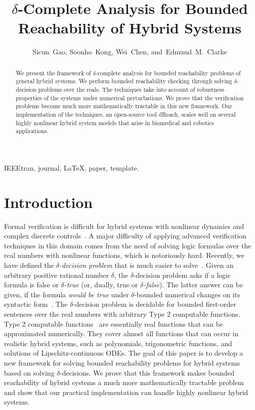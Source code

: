 \documentclass[journal]{IEEEtran}
\begin{document}
\title{$\delta$-Complete Analysis for Bounded Reachability of Hybrid Systems}
\author{Sicun~Gao,
  Soonho~Kong,
  Wei~Chen,
  and~Edmund~M.~Clarke}

\maketitle
\begin{abstract}
We present the framework of $\delta$-complete analysis for bounded reachability problems of general hybrid systems. We perform bounded reachability checking through solving $\delta$-decision problems over the reals. The techniques take into account of robustness properties of the systems under numerical perturbations. We prove that the verification problems become much more mathematically tractable in this new framework. Our implementation of the techniques, an open-source tool {\sf dReach}, scales well on several highly nonlinear hybrid system models that arise in biomedical and robotics applications.
\end{abstract}
\begin{IEEEkeywords}
IEEEtran, journal, \LaTeX, paper, template.
\end{IEEEkeywords}

\section{Introduction}
Formal verification is difficult for hybrid systems with nonlinear dynamics and complex discrete controls~\cite{DBLP:conf/emsoft/Alur11,DBLP:conf/lics/Henzinger96}. A major difficulty of applying advanced verification techniques in this domain comes from the need of solving logic formulas over the real numbers with nonlinear functions, which is notoriously hard. Recently, we have defined the {\em $\delta$-decision problem} that is much easier to solve~\cite{DBLP:conf/lics/GaoAC12,DBLP:conf/cade/GaoAC12}. Given an arbitrary positive rational number $\delta$, the $\delta$-decision problem asks if a logic formula is false or {\em $\delta$-true} (or, dually, true or {\em $\delta$-false}). The latter answer can be given, if the formula {\em would be true} under $\delta$-bounded numerical changes on its syntactic form~\cite{DBLP:conf/lics/GaoAC12}. The $\delta$-decision problem is decidable for bounded first-order sentences over the real numbers with arbitrary Type 2 computable functions. Type 2 computable functions~\cite{CAbook} are essentially real functions that can be approximated numerically. They cover almost all functions that can occur in realistic hybrid systems, such as polynomials, trigonometric functions, and solutions of Lipschitz-continuous ODEs. The goal of this paper is to develop a new framework for solving bounded reachability problems for hybrid systems based on solving $\delta$-decisions. We prove that this framework makes bounded reachability of hybrid systems a much more mathematically tractable problem and show that our practical implementation can handle highly nonlinear hybrid systems.
\end{document}
